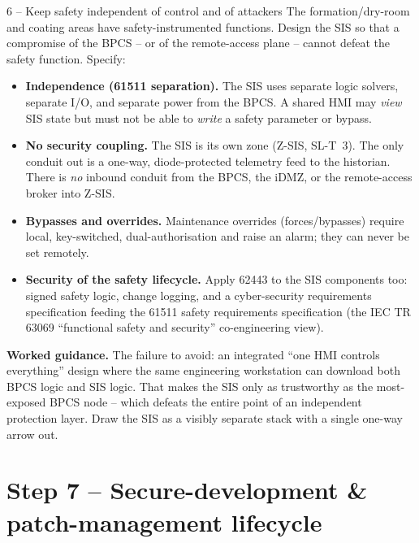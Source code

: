 \documentclass[11pt,a4paper]{article}
\begin{document}
\begin{stepbox}{6 -- Keep safety independent of control and of attackers}
The formation/dry-room and coating areas have safety-instrumented
functions. Design the SIS so that a compromise of the BPCS -- or of the
remote-access plane -- cannot defeat the safety function. Specify:
\begin{itemize}\setlength{\itemsep}{1pt}
  \item \textbf{Independence (61511 separation).} The SIS uses separate
    logic solvers, separate I/O, and separate power from the BPCS.
    A shared HMI may \emph{view} SIS state but must not be able to
    \emph{write} a safety parameter or bypass.
  \item \textbf{No security coupling.} The SIS is its own zone (Z-SIS,
    SL-T~3). The only conduit out is a one-way, diode-protected telemetry
    feed to the historian. There is \emph{no} inbound conduit from the
    BPCS, the iDMZ, or the remote-access broker into Z-SIS.
  \item \textbf{Bypasses and overrides.} Maintenance overrides
    (forces/bypasses) require local, key-switched, dual-authorisation
    and raise an alarm; they can never be set remotely.
  \item \textbf{Security of the safety lifecycle.} Apply 62443 to the SIS
    components too: signed safety logic, change logging, and a
    cyber-security requirements specification feeding the 61511 safety
    requirements specification (the IEC TR 63069 ``functional safety and
    security'' co-engineering view).
\end{itemize}

\medskip
\noindent\textbf{Worked guidance.} The failure to avoid: an integrated
``one HMI controls everything'' design where the same engineering
workstation can download both BPCS logic and SIS logic. That makes the
SIS only as trustworthy as the most-exposed BPCS node -- which defeats
the entire point of an independent protection layer. Draw the SIS as a
visibly separate stack with a single one-way arrow out.
\end{stepbox}

\section*{Step 7 -- Secure-development \& patch-management lifecycle}
\end{document}
